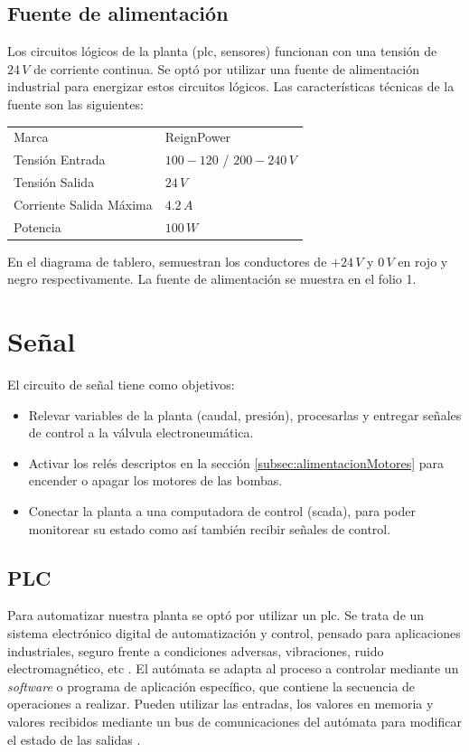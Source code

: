 \subsection{Fuente de alimentación}
\label{subsec:fuenteAlim}
Los circuitos lógicos de la planta (\gls{plc}, sensores) funcionan con una
tensión de $24\,V$ de corriente continua.
Se optó por utilizar una fuente de alimentación industrial para energizar estos
circuitos lógicos.
Las características técnicas de la fuente son las siguientes:
\begin{center}
\begin{tabular}{|l|l|}
\hline
Marca & ReignPower\\
Tensión Entrada& $100-120$ / $200-240\,V$\\
Tensión Salida& $24\,V$\\
Corriente Salida Máxima& $4.2\,A$\\
Potencia & $100\,W$\\
\hline
\end{tabular}
\end{center}

En el diagrama de tablero, semuestran los conductores de $+24\,V$ y $0\,V$ en
rojo y negro respectivamente.
La fuente de alimentación se muestra en el folio 1.

\section{Señal}
\label{sec:Senal}

El circuito de señal tiene como objetivos:
\begin{itemize}
 \item Relevar variables de la planta (caudal, presión), procesarlas y entregar
señales de control a la válvula electroneumática.
\item Activar los relés descriptos en la sección
\ref{subsec:alimentacionMotores} para encender o apagar los motores de las
bombas.
\item Conectar la planta a una computadora de control (\gls{scada}), para poder
monitorear su estado como así también recibir señales de control.
\end{itemize}

\subsection{PLC}
\label{subsec:plc}

Para automatizar nuestra planta se optó por utilizar un \gls{plc}.
Se trata de un sistema electrónico digital de automatización y control, pensado
para aplicaciones industriales, seguro frente a condiciones adversas,
vibraciones, ruido electromagnético, etc \cite{bib:ApuntesJGabriel}.
El autómata se adapta al proceso a controlar mediante un
\textit{software} o programa de aplicación específico, que contiene la secuencia
de operaciones a realizar.
Pueden utilizar las entradas, los valores en memoria y valores
recibidos mediante un bus de comunicaciones del autómata para modificar el
estado de las salidas \cite{bib:libroAutomat1}.

